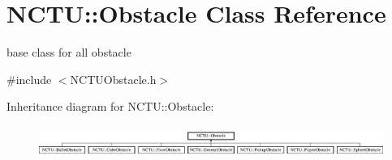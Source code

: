 \hypertarget{class_n_c_t_u_1_1_obstacle}{}\section{N\+C\+TU\+:\+:Obstacle Class Reference}
\label{class_n_c_t_u_1_1_obstacle}


base class for all obstacle  




{\ttfamily \#include $<$N\+C\+T\+U\+Obstacle.\+h$>$}

Inheritance diagram for N\+C\+TU\+:\+:Obstacle\+:\begin{figure}[H]
\begin{center}
\leavevmode
\includegraphics[height=1.038961cm]{class_n_c_t_u_1_1_obstacle}
\end{center}
\end{figure}

